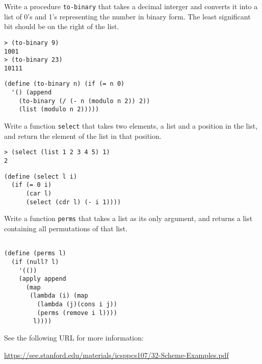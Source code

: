 \documentclass[addpoints,12pt,a4paper]{exam}
\begin{document}
\begin{questions}
\question
Write a procedure \texttt{to-binary} that takes a decimal interger and converts it into a list of 0's and 1's representing the number in binary form.
The least significant bit should be on the right of the list.
\begin{verbatim}
> (to-binary 9)
1001
> (to-binary 23)
10111
\end{verbatim}

\begin{solution}
  \begin{verbatim}
(define (to-binary n) (if (= n 0)
  '() (append
    (to-binary (/ (- n (modulo n 2)) 2))
    (list (modulo n 2)))))
  \end{verbatim}
\end{solution}

\question
Write a function \texttt{select} that takes two elements, a list and a position in the list, and return the element of the list in that position.
\begin{verbatim}
> (select (list 1 2 3 4 5) 1)
2
\end{verbatim}

\begin{solution}
  \begin{verbatim}
(define (select l i)
  (if (= 0 i)
      (car l)
      (select (cdr l) (- i 1))))
  \end{verbatim}
\end{solution}

\question
Write a function \texttt{perms} that takes a list as its only argument, and returns a list containing all permutations of that list.

\begin{solution}
\begin{verbatim}

(define (perms l)
  (if (null? l)
    '(())
    (apply append
      (map
       (lambda (i) (map
         (lambda (j)(cons i j))
         (perms (remove i l))))
        l))))
  \end{verbatim}

See the following URL for more information:

\url{https://see.stanford.edu/materials/icsppcs107/32-Scheme-Examples.pdf}
\end{solution}

\end{questions}



\end{document}
